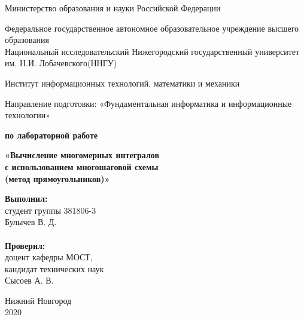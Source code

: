 \documentclass{report}
\begin{document}
\begin{titlepage}
\begin{center}
Министерство образования и науки Российской Федерации
\end{center}
\begin{center}
Федеральное государственное автономное образовательное учреждение высшего образования \\
Национальный исследовательский Нижегородский государственный университет им. Н.И. Лобачевского(ННГУ)
\end{center}
\begin{center}
Институт информационных технологий, математики и механики
\end{center}
\begin{center}
Направление подготовки: «Фундаментальная информатика и информационные технологии»
\end{center}

\vspace{2em}

\begin{center}
\textbf{ по лабораторной работе} 
\end{center}
\begin{center}
\textbf{\Large«Вычисление многомерных интегралов \\
с использованием многошаговой схемы \\
(метод прямоугольников)»} \\
\end{center}

\vspace{4em}

\newbox{\lbox}
\newlength{\maxl}
\setlength{\maxl}{\wd\lbox}
\hfill\parbox{7cm}{
\textbf{Выполнил:} \\
студент группы 381806-3 \\
Булычев В. Д.\\
\\
\textbf{Проверил:} \\
доцент кафедры МОСТ, \\
кандидат технических наук \\
Сысоев А. В.
}
\vspace{\fill}
\begin{center} Нижний Новгород \\ 2020 \end{center}
\end{titlepage}

\setcounter{page}{2}
\end{document}
